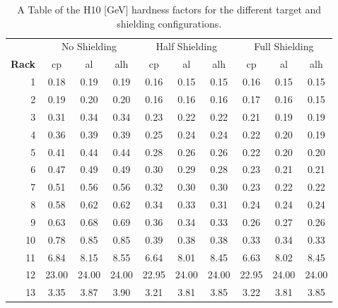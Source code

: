 \begin{table}[htbp]
\centering
\begin{tabular}{r|c|c|c|c|c|c|c|c|c}
& \multicolumn{3}{c|}{No Shielding} & \multicolumn{3}{c|}{Half Shielding} & \multicolumn{3}{c}{Full Shielding} \\ \cline{2-10}
\textbf{Rack}  & cp    & al    & alh   & cp    & al    & alh & cp    & al    & alh\\ 
\hline
1  &     0.18 &     0.19 &      0.19 &     0.16 &     0.15 &      0.15 &     0.16 &     0.15 &      0.15 \\
2  &     0.19 &     0.20 &      0.20 &     0.16 &     0.16 &      0.16 &     0.17 &     0.16 &      0.15 \\
3  &     0.31 &     0.34 &      0.34 &     0.23 &     0.22 &      0.22 &     0.21 &     0.19 &      0.19 \\
4  &     0.36 &     0.39 &      0.39 &     0.25 &     0.24 &      0.24 &     0.22 &     0.20 &      0.19 \\
5  &     0.41 &     0.44 &      0.44 &     0.28 &     0.26 &      0.26 &     0.22 &     0.20 &      0.20 \\
6  &     0.47 &     0.49 &      0.49 &     0.30 &     0.29 &      0.28 &     0.23 &     0.21 &      0.21 \\
7  &     0.51 &     0.56 &      0.56 &     0.32 &     0.30 &      0.30 &     0.23 &     0.22 &      0.22 \\
8  &     0.58 &     0.62 &      0.62 &     0.34 &     0.33 &      0.31 &     0.24 &     0.24 &      0.24 \\
9  &     0.63 &     0.68 &      0.69 &     0.36 &     0.34 &      0.33 &     0.26 &     0.27 &      0.26 \\
10 &     0.78 &     0.85 &      0.85 &     0.39 &     0.38 &      0.38 &     0.33 &     0.34 &      0.33 \\
11 &     6.84 &     8.15 &      8.55 &     6.64 &     8.01 &      8.45 &     6.63 &     8.02 &      8.45 \\
12 &    23.00 &    24.00 &     24.00 &    22.95 &    24.00 &     24.00 &    22.95 &    24.00 &     24.00 \\
13 &     3.35 &     3.87 &      3.90 &     3.21 &     3.81 &      3.85 &     3.22 &     3.81 &      3.85 \\
\end{tabular}
\caption{A Table of the H10 [GeV] hardness factors for the different target and shielding configurations. }
\label{tab:hardness10}%
\end{table}%

